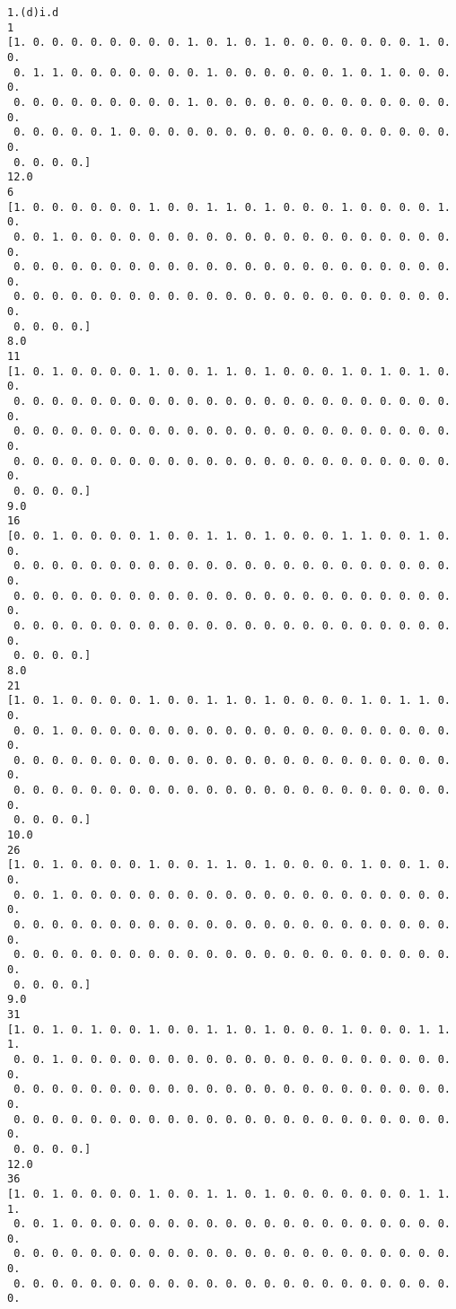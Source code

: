 \documentclass[11pt]{article}
\begin{document}
    \begin{Verbatim}[commandchars=\\\{\}]
1.(d)i.d
1
[1. 0. 0. 0. 0. 0. 0. 0. 0. 1. 0. 1. 0. 1. 0. 0. 0. 0. 0. 0. 0. 1. 0. 0.
 0. 1. 1. 0. 0. 0. 0. 0. 0. 0. 1. 0. 0. 0. 0. 0. 0. 1. 0. 1. 0. 0. 0. 0.
 0. 0. 0. 0. 0. 0. 0. 0. 0. 1. 0. 0. 0. 0. 0. 0. 0. 0. 0. 0. 0. 0. 0. 0.
 0. 0. 0. 0. 0. 1. 0. 0. 0. 0. 0. 0. 0. 0. 0. 0. 0. 0. 0. 0. 0. 0. 0. 0.
 0. 0. 0. 0.]
12.0
6
[1. 0. 0. 0. 0. 0. 0. 1. 0. 0. 1. 1. 0. 1. 0. 0. 0. 1. 0. 0. 0. 0. 1. 0.
 0. 0. 1. 0. 0. 0. 0. 0. 0. 0. 0. 0. 0. 0. 0. 0. 0. 0. 0. 0. 0. 0. 0. 0.
 0. 0. 0. 0. 0. 0. 0. 0. 0. 0. 0. 0. 0. 0. 0. 0. 0. 0. 0. 0. 0. 0. 0. 0.
 0. 0. 0. 0. 0. 0. 0. 0. 0. 0. 0. 0. 0. 0. 0. 0. 0. 0. 0. 0. 0. 0. 0. 0.
 0. 0. 0. 0.]
8.0
11
[1. 0. 1. 0. 0. 0. 0. 1. 0. 0. 1. 1. 0. 1. 0. 0. 0. 1. 0. 1. 0. 1. 0. 0.
 0. 0. 0. 0. 0. 0. 0. 0. 0. 0. 0. 0. 0. 0. 0. 0. 0. 0. 0. 0. 0. 0. 0. 0.
 0. 0. 0. 0. 0. 0. 0. 0. 0. 0. 0. 0. 0. 0. 0. 0. 0. 0. 0. 0. 0. 0. 0. 0.
 0. 0. 0. 0. 0. 0. 0. 0. 0. 0. 0. 0. 0. 0. 0. 0. 0. 0. 0. 0. 0. 0. 0. 0.
 0. 0. 0. 0.]
9.0
16
[0. 0. 1. 0. 0. 0. 0. 1. 0. 0. 1. 1. 0. 1. 0. 0. 0. 1. 1. 0. 0. 1. 0. 0.
 0. 0. 0. 0. 0. 0. 0. 0. 0. 0. 0. 0. 0. 0. 0. 0. 0. 0. 0. 0. 0. 0. 0. 0.
 0. 0. 0. 0. 0. 0. 0. 0. 0. 0. 0. 0. 0. 0. 0. 0. 0. 0. 0. 0. 0. 0. 0. 0.
 0. 0. 0. 0. 0. 0. 0. 0. 0. 0. 0. 0. 0. 0. 0. 0. 0. 0. 0. 0. 0. 0. 0. 0.
 0. 0. 0. 0.]
8.0
21
[1. 0. 1. 0. 0. 0. 0. 1. 0. 0. 1. 1. 0. 1. 0. 0. 0. 0. 1. 0. 1. 1. 0. 0.
 0. 0. 1. 0. 0. 0. 0. 0. 0. 0. 0. 0. 0. 0. 0. 0. 0. 0. 0. 0. 0. 0. 0. 0.
 0. 0. 0. 0. 0. 0. 0. 0. 0. 0. 0. 0. 0. 0. 0. 0. 0. 0. 0. 0. 0. 0. 0. 0.
 0. 0. 0. 0. 0. 0. 0. 0. 0. 0. 0. 0. 0. 0. 0. 0. 0. 0. 0. 0. 0. 0. 0. 0.
 0. 0. 0. 0.]
10.0
26
[1. 0. 1. 0. 0. 0. 0. 1. 0. 0. 1. 1. 0. 1. 0. 0. 0. 0. 1. 0. 0. 1. 0. 0.
 0. 0. 1. 0. 0. 0. 0. 0. 0. 0. 0. 0. 0. 0. 0. 0. 0. 0. 0. 0. 0. 0. 0. 0.
 0. 0. 0. 0. 0. 0. 0. 0. 0. 0. 0. 0. 0. 0. 0. 0. 0. 0. 0. 0. 0. 0. 0. 0.
 0. 0. 0. 0. 0. 0. 0. 0. 0. 0. 0. 0. 0. 0. 0. 0. 0. 0. 0. 0. 0. 0. 0. 0.
 0. 0. 0. 0.]
9.0
31
[1. 0. 1. 0. 1. 0. 0. 1. 0. 0. 1. 1. 0. 1. 0. 0. 0. 1. 0. 0. 0. 1. 1. 1.
 0. 0. 1. 0. 0. 0. 0. 0. 0. 0. 0. 0. 0. 0. 0. 0. 0. 0. 0. 0. 0. 0. 0. 0.
 0. 0. 0. 0. 0. 0. 0. 0. 0. 0. 0. 0. 0. 0. 0. 0. 0. 0. 0. 0. 0. 0. 0. 0.
 0. 0. 0. 0. 0. 0. 0. 0. 0. 0. 0. 0. 0. 0. 0. 0. 0. 0. 0. 0. 0. 0. 0. 0.
 0. 0. 0. 0.]
12.0
36
[1. 0. 1. 0. 0. 0. 0. 1. 0. 0. 1. 1. 0. 1. 0. 0. 0. 0. 0. 0. 0. 1. 1. 1.
 0. 0. 1. 0. 0. 0. 0. 0. 0. 0. 0. 0. 0. 0. 0. 0. 0. 0. 0. 0. 0. 0. 0. 0.
 0. 0. 0. 0. 0. 0. 0. 0. 0. 0. 0. 0. 0. 0. 0. 0. 0. 0. 0. 0. 0. 0. 0. 0.
 0. 0. 0. 0. 0. 0. 0. 0. 0. 0. 0. 0. 0. 0. 0. 0. 0. 0. 0. 0. 0. 0. 0. 0.

\end{Verbatim}
\end{document}
